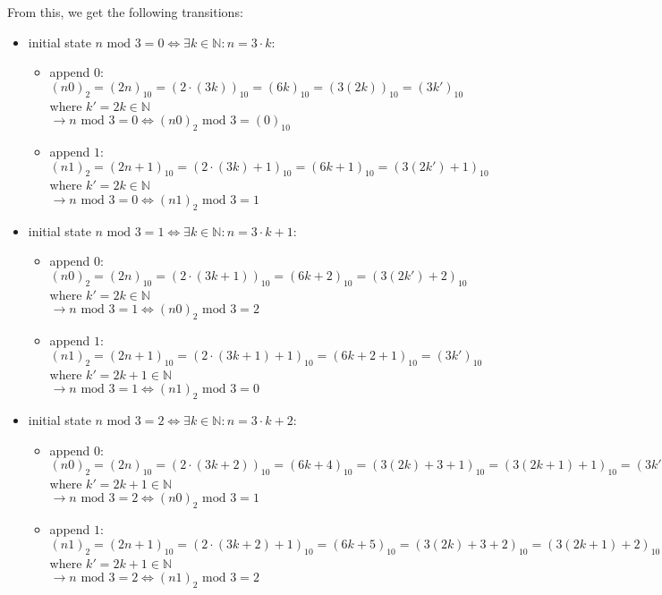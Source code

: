From this, we get the following transitions:
\begin{itemize}
    \item initial state $n \text{ mod } 3 = 0 \Leftrightarrow \exists k \in \mathbb{N}: n = 3\cdot k$:
    \begin{itemize}
        \item append $0$: $(n0)_{2} = (2n)_{10} = (2\cdot(3k))_{10} = (6k)_{10} = (3(2k))_{10} = (3k')_{10}$\\
        where $k'=2k \in \mathbb{N}$\\
		    $\rightarrow n \text{ mod } 3 = 0 \Leftrightarrow (n0)_{2} \text{ mod } 3 = (0)_{10}$
	    \item append $1$: $(n1)_{2} = (2n+1)_{10} = (2\cdot(3k)+1)_{10} = (6k+1)_{10} = (3(2k')+1)_{10}$\\
        where $k'=2k \in \mathbb{N}$\\
        $\rightarrow n \text{ mod } 3 = 0 \Leftrightarrow (n1)_{2} \text{ mod } 3 = 1$
    \end{itemize}
    \item initial state $n \text{ mod } 3 = 1 \Leftrightarrow \exists k \in \mathbb{N}: n = 3\cdot k + 1$:
    \begin{itemize}
	    \item append $0$: $(n0)_{2} = (2n)_{10} = (2\cdot(3k+1))_{10} = (6k+2)_{10} = (3(2k')+2)_{10}$\\
        where $k'=2k \in \mathbb{N}$\\
        $\rightarrow n \text{ mod } 3 = 1 \Leftrightarrow (n0)_{2} \text{ mod } 3 = 2$
	\item append $1$: $(n1)_{2} = (2n+1)_{10} = (2\cdot(3k+1)+1)_{10} = (6k+2+1)_{10} = (3k')_{10}$\\
        where $k'=2k+1 \in \mathbb{N}$\\
        $\rightarrow n \text{ mod } 3 = 1 \Leftrightarrow (n1)_{2} \text{ mod } 3 = 0$
    \end{itemize}
    \item initial state $n \text{ mod } 3 = 2 \Leftrightarrow \exists k \in \mathbb{N}: n = 3\cdot k + 2$:
    \begin{itemize}
	    \item append $0$: $(n0)_{2} = (2n)_{10} = (2\cdot(3k+2))_{10} = (6k+4)_{10} = (3(2k)+3+1)_{10} = (3(2k+1)+1)_{10} = (3k'+1)_{10}$\\
        where $k' = 2k+1\in \mathbb{N}$\\
        $\rightarrow n \text{ mod } 3 = 2 \Leftrightarrow (n0)_{2} \text{ mod } 3 = 1$
	\item append $1$: $(n1)_{2} = (2n+1)_{10} = (2\cdot(3k+2)+1)_{10} = (6k+5)_{10} = (3(2k)+3+2)_{10} = (3(2k+1)+2)_{10} = (3k'+2)_{10}$\\
        where $k'=2k+1 \in \mathbb{N}$\\
        $\rightarrow n \text{ mod } 3 = 2 \Leftrightarrow (n1)_{2} \text{ mod } 3 = 2$
    \end{itemize}
\end{itemize}

